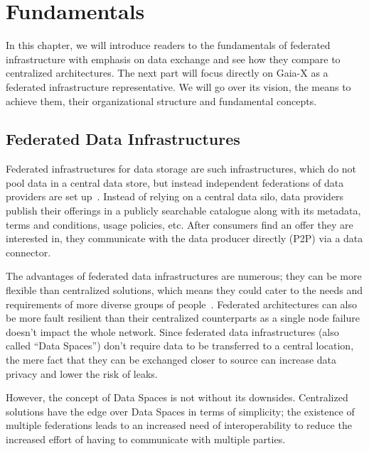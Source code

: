 \chapter{Fundamentals}\label{ch:fundamentals}

\begin{chapterabstract}
    In this chapter, we will introduce readers to the fundamentals of federated infrastructure with emphasis on data exchange and see how they compare to centralized architectures.
    The next part will focus directly on Gaia-X as a federated infrastructure representative.
    We will go over its vision, the means to achieve them, their organizational structure and fundamental concepts.
\end{chapterabstract}

\section{Federated Data Infrastructures}\label{sec:federated-data-infrastructures}

Federated infrastructures for data storage are such infrastructures, which do not pool data in a central data store, but instead independent federations of data providers are set up~\cite{otto_federated_2022}.
Instead of relying on a central data silo, data providers publish their offerings in a publicly searchable catalogue along with its metadata, terms and conditions, usage policies, etc.
After consumers find an offer they are interested in, they communicate with the data producer directly (P2P) via a data connector.

The advantages of federated data infrastructures are numerous; they can be more flexible than centralized solutions, which means they could cater to the needs and requirements of more diverse groups of people~\cite{raab_federated_2023}.
Federated architectures can also be more fault resilient than their centralized counterparts as a single node failure doesn't impact the whole network.
Since federated data infrastructures (also called ``Data Spaces'') don't require data to be transferred to a central location, the mere fact that they can be exchanged closer to source can increase data privacy and lower the risk of leaks.

However, the concept of Data Spaces is not without its downsides.
Centralized solutions have the edge over Data Spaces in terms of simplicity; the existence of multiple federations leads to an increased need of interoperability to reduce the increased effort of having to communicate with multiple parties.

